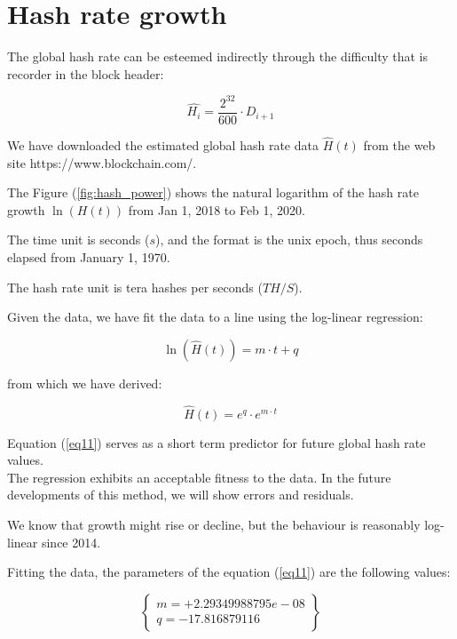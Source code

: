 \documentclass{article}
\begin{document}
\section{Hash rate growth}

The global hash rate can be esteemed indirectly through the difficulty that is recorder in the block header:

\begin{equation}
    \widehat{H_{i}} = \frac{2^{32}}{600} \cdot D_{i+1} \label{H_estimate}
\end{equation}

We have downloaded the estimated global hash rate data $\widehat{H}(t)$ from the web site https://www.blockchain.com/.

The Figure (\ref{fig:hash_power}) shows the natural logarithm of the hash rate growth $\ln(H(t))$ from Jan 1, 2018 to Feb 1, 2020.

The time unit is seconds ($s$), and the format is the unix epoch, thus seconds elapsed from January 1, 1970.

The hash rate unit is tera hashes per seconds ($TH/S$).

Given the data, we have fit the data to a line using the log-linear regression:

\begin{equation}
    \ln(\widehat{H}(t)) = m \cdot t + q  \label{eq1}
\end{equation}

from which we have derived:

\begin{equation}
    \widehat{H}(t) = e^{q} \cdot e^{m \cdot t} \label{eq11}
\end{equation}

Equation (\ref{eq11}) serves as a short term predictor for future global hash rate values.\\

The regression exhibits an acceptable fitness to the data. In the future developments of this method, we will show errors and residuals.

We know that growth might rise or decline, but the behaviour is reasonably log-linear since 2014.

Fitting the data, the parameters of the equation (\ref{eq11}) are the following values:

\begin{equation}
    \left \{
        \begin{array}{ll}
            m = +2.29349988795e-08 \\
            q = -17.816879116
        \end{array}
    \right \} \label{values}
\end{equation}
\end{document}
